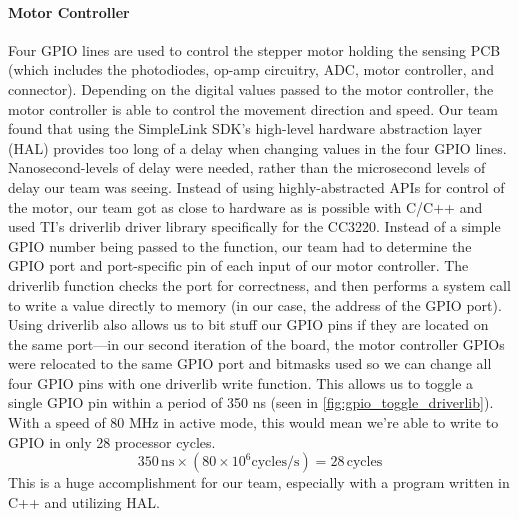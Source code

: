 \paragraph{Motor Controller}
Four GPIO lines are used to control the stepper motor holding the sensing PCB (which includes the photodiodes, op-amp circuitry, ADC, motor controller, and connector). Depending on the digital values passed to the motor controller, the motor controller is able to control the movement direction and speed. Our team found that using the SimpleLink SDK's high-level hardware abstraction layer (HAL) provides too long of a delay when changing values in the four GPIO lines. Nanosecond-levels of delay were needed, rather than the microsecond levels of delay our team was seeing. Instead of using highly-abstracted APIs for control of the motor, our team got as close to hardware as is possible with C/C++ and used TI's driverlib driver library specifically for the CC3220. Instead of a simple GPIO number being passed to the function, our team had to determine the GPIO port and port-specific pin of each input of our motor controller. The driverlib function checks the port for correctness, and then performs a system call to write a value directly to memory (in our case, the address of the GPIO port). Using driverlib also allows us to bit stuff our GPIO pins if they are located on the same port---in our second iteration of the board, the motor controller GPIOs were relocated to the same GPIO port and bitmasks used so we can change all four GPIO pins with one driverlib write function. This allows us to toggle a single GPIO pin within a period of 350 ns (seen in \ref{fig:gpio_toggle_driverlib}). With a speed of 80 MHz in active mode, this would mean we're able to write to GPIO in only 28 processor cycles.
\begin{equation}
    350\,\mathrm{ns} \times (80\times10^6\mathrm{cycles/s}) = 28\,\mathrm{cycles}
\end{equation}
This is a huge accomplishment for our team, especially with a program written in C++ and utilizing HAL.

